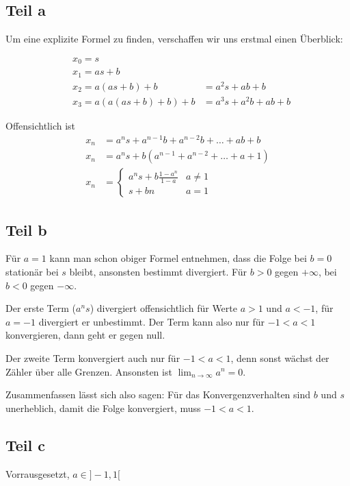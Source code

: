\documentclass[a4paper,german,12pt,smallheadings]{scrartcl}
\begin{document}
\subsection*{Teil a}

Um eine explizite Formel zu finden, verschaffen wir uns erstmal einen Überblick:

\begin{align*}
  &x_0 = s \\
  &x_1 = as + b \\
  &x_2 = a(as+b) + b    &= a^2s+ab+b\\
  &x_3 = a(a(as+b)+b)+b &= a^3s + a^2b +ab + b
\end{align*}

Offensichtlich ist
\begin{align*}
  x_n &= a^ns + a^{n-1}b + a^{n-2}b + \dots + ab + b \\
  x_n &= a^ns + b(a^{n-1} + a^{n-2} + \dots + a + 1) \\
  x_n &= \left\{\begin{array}{ll} a^ns + b \frac{1-a^n}{1-a} & a \neq 1 \\
         s + bn & a = 1\end{array}\right.
\end{align*}

\subsection*{Teil b}
Für $a=1$ kann man schon obiger Formel entnehmen, dass die Folge bei $b=0$
stationär bei $s$ bleibt, ansonsten bestimmt divergiert. Für $b > 0$ gegen
$+\infty$, bei $b<0$ gegen $-\infty$.

Der erste Term ($a^ns$) divergiert offensichtlich für Werte $a > 1$ und $a
< -1$, für $a = -1$ divergiert er unbestimmt. Der Term kann also nur für $-1 <
a < 1$ konvergieren, dann geht er gegen null.

Der zweite Term konvergiert auch nur für $-1 < a < 1$, denn sonst wächst der
Zähler über alle Grenzen. Ansonsten ist $\lim_{n \to \infty} a^n = 0$.

Zusammenfassen lässt sich also sagen: Für das Konvergenzverhalten sind $b$ und
$s$ unerheblich, damit die Folge konvergiert, muss $-1 < a < 1$.

\subsection*{Teil c}

Vorrausgesetzt, $a \in ]-1,1[$
\end{document}
